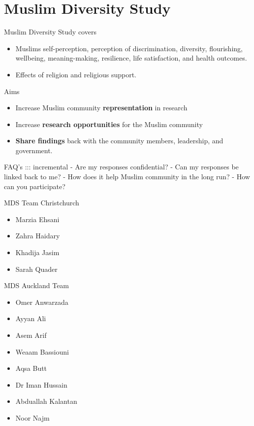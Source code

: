 \documentclass[
  ignorenonframetext,
  aspectratio=169,
]{beamer}
\providecommand{\tightlist}{%
  \setlength{\itemsep}{0pt}\setlength{\parskip}{0pt}}\usepackage{longtable,booktabs,array}
\begin{document}
\section{Muslim Diversity Study}\label{muslim-diversity-study}

\begin{frame}{Muslim Diversity Study covers}
\label{muslim-diversity-study-covers}
\begin{itemize}[<+->]
\tightlist
\item
  Muslims self-perception, perception of discrimination, diversity,
  flourishing, wellbeing, meaning-making, resilience, life satisfaction,
  and health outcomes.
\item
  Effects of religion and religious support.
\end{itemize}
\end{frame}

\begin{frame}{Aims}
\label{aims}
\begin{itemize}[<+->]
\tightlist
\item
  Increase Muslim community \textbf{representation} in research
\item
  Increase \textbf{research opportunities} for the Muslim community
\item
  \textbf{Share findings} back with the community members, leadership,
  and government.
\end{itemize}
\end{frame}

\begin{frame}{FAQ's}
\label{faqs}
::: incremental - Are my responses confidential? - Can my responses be
linked back to me? - How does it help Muslim community in the long run?
- How can you participate?
\end{frame}

\begin{frame}{MDS Team Christchurch}
\label{mds-team-christchurch}
\begin{itemize}
\tightlist
\item
  Marzia Ehsani
\item
  Zahra Haidary
\item
  Khadija Jasim
\item
  Sarah Quader
\end{itemize}
\end{frame}

\begin{frame}{MDS Auckland Team}
\label{mds-auckland-team}
\begin{itemize}
\tightlist
\item
  Omer Anwarzada
\item
  Ayyan Ali
\item
  Asem Arif
\item
  Weaam Bassiouni
\item
  Aqsa Butt
\item
  Dr Iman Hussain
\item
  Abduallah Kalantan
\item
  Noor Najm
\end{itemize}
\end{frame}
\end{document}
